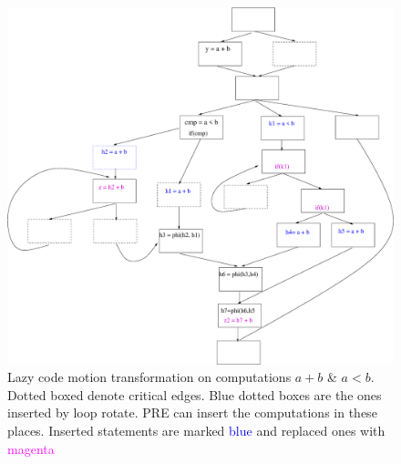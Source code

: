 \begin{figure}[htbp]
  \begin{center}
     \includegraphics[scale=0.3]{Figs/2} 
  \end{center}
  \caption{Lazy code motion transformation on computations $a + b$ \& $a < b$.
    Dotted boxed denote critical edges. Blue dotted boxes are the ones inserted
      by loop rotate. PRE can insert the computations in these places. Inserted
      statements are marked \textcolor{blue}{blue} and replaced ones with
      \textcolor{magenta}{magenta} } 

  \label{fig:2} 
\end{figure}
